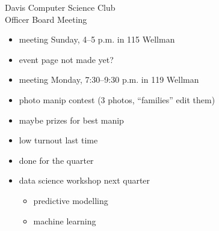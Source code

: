 \documentclass{article}
\begin{document}
\begin{Minutes}{Davis Computer Science Club\\Officer Board Meeting}
\begin{itemize}
\item meeting Sunday, 4--5 p.m. in 115 Wellman
\item event page not made yet?
\end{itemize}

\begin{itemize}
\item meeting Monday, 7:30--9:30 p.m. in 119 Wellman
\item photo manip contest (3 photos, ``families'' edit them)
\item maybe prizes for best manip
\end{itemize}

\begin{itemize}
\item low turnout last time
\item done for the quarter
\end{itemize}

\begin{itemize}
\item data science workshop next quarter
  \begin{itemize}
  \item predictive modelling
  \item machine learning
  \end{itemize}
\end{itemize}


\end{Minutes}
\end{document}
